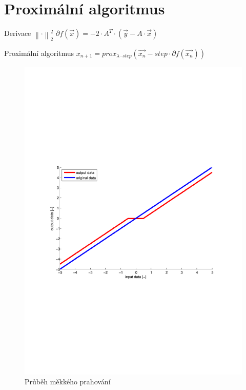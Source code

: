 \section{Proximální algoritmus}
\begin{frame}
	\vfill
	\begin{block}{Derivace $\left\| \cdot \right\|_{2}^{2} $}
		$\partial f(\vec{x}) = -2 \cdot A^T \cdot (\vec{y}-A \cdot \vec{x})$
	\end{block}
			\begin{block}{Proximální algoritmus}
				$x_{n+1} = prox_{\lambda \cdot step}(\vec{x_{n}}- step \cdot \partial f(\vec{x_{n}}))$
			\end{block}
\end{frame}
\begin{frame}
	\vfill
	\begin{figure}[!ht]
		\begin{center}
			\includegraphics[scale=0.6]{obr/threshhold.pdf}
		\end{center}
		\caption{Průběh měkkého prahování}
		\label{fig:nse}
	\end{figure}
\end{frame}
